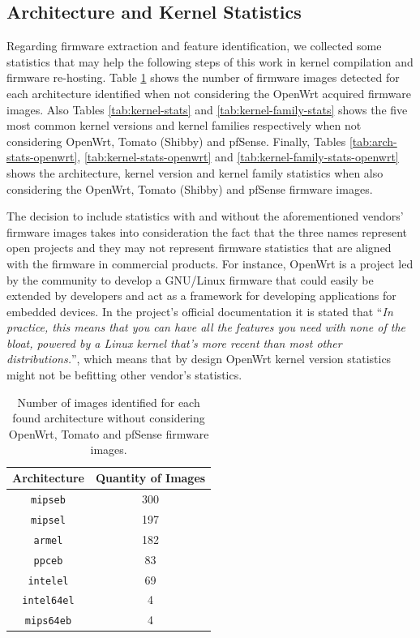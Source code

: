 
\subsection{Architecture and Kernel Statistics}

Regarding firmware extraction and feature identification, we collected some statistics that may help the following steps of this work in kernel compilation and firmware re-hosting. Table \ref{tab:arch-stats} shows the number of firmware images detected for each architecture identified when not considering the OpenWrt acquired firmware images. Also Tables \ref{tab:kernel-stats} and \ref{tab:kernel-family-stats} shows the five most common kernel versions and kernel families respectively when not considering OpenWrt, Tomato (Shibby) and pfSense. Finally, Tables \ref{tab:arch-stats-openwrt}, \ref{tab:kernel-stats-openwrt} and \ref{tab:kernel-family-stats-openwrt} shows the architecture, kernel version and kernel family statistics when also considering the OpenWrt, Tomato (Shibby) and pfSense firmware images.

The decision to include statistics with and without the aforementioned vendors' firmware images takes into consideration the fact that the three names represent open projects and they may not represent firmware statistics that are aligned with the firmware in commercial products. For instance, OpenWrt is a project led by the community to develop a GNU/Linux firmware that could easily be extended by developers and act as a framework for developing applications for embedded devices. In the project's official documentation it is stated that ``\textit{In practice, this means that you can have all the features you need with none of the bloat, powered by a Linux kernel that's more recent than most other distributions.}'', which means that by design OpenWrt kernel version statistics might not be befitting other vendor's statistics.

\begin{table}[H]
\centering
\caption{Number of images identified for each found architecture without considering OpenWrt, Tomato and pfSense firmware images.}
\begin{tabular}{|c|c|}
\hline
\textbf{Architecture}       & \textbf{Quantity of Images} \\ \hline
{\tt mipseb}                &  300                        \\ 
{\tt mipsel}                &  197                        \\ 
{\tt armel}                 &  182                        \\ 
{\tt ppceb}                 &   83                        \\ 
{\tt intelel}               &   69                        \\ 
{\tt intel64el}             &    4                        \\ 
{\tt mips64eb}              &    4                        \\ \hline
\end{tabular}
\label{tab:arch-stats}
\end{table}

